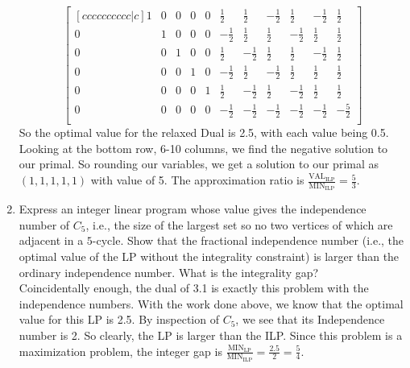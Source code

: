 \documentclass[12pt]{article}
\newenvironment{exercise}[2][Exercise]{\begin{trivlist}
		\item[\hskip \labelsep {\bfseries #1}\hskip \labelsep {\bfseries #2.}]}{\end{trivlist}}
\begin{document}
\begin{exercise}{3}
\begin{enumerate}
			\[\begin{bmatrix}[cccccccccc|c]
				1 &  0 &  0 & 0 & 0  & \frac{1}{2}  & \frac{1}{2}  & -\frac{1}{2}  & \frac{1}{2}  & -\frac{1}{2} & \frac{1}{2} \\
				0 &  1 &  0 & 0 & 0 & -\frac{1}{2} & \frac{1}{2}  & \frac{1}{2}  & -\frac{1}{2}  & \frac{1}{2} & \frac{1}{2} \\
				0 &  0 &  1 & 0 & 0  & \frac{1}{2}  & -\frac{1}{2} & \frac{1}{2}  & \frac{1}{2}  & -\frac{1}{2} & \frac{1}{2} \\
				0 &  0 &  0 & 1 & 0  & -\frac{1}{2} & \frac{1}{2}  & -\frac{1}{2} & \frac{1}{2}  & \frac{1}{2} & \frac{1}{2} \\
				0 &  0 &  0 & 0 & 1  & \frac{1}{2}  & -\frac{1}{2} & \frac{1}{2}  & -\frac{1}{2} & \frac{1}{2} & \frac{1}{2} \\
				0 &  0 &  0 & 0 & 0  & -\frac{1}{2}  & -\frac{1}{2} & -\frac{1}{2}  & -\frac{1}{2} & -\frac{1}{2} & -\frac{5}{2}\\
			\end{bmatrix}\]
			So the optimal value for the relaxed Dual is 2.5, with each value being 0.5. Looking at the bottom row, 6-10 columns, we find the negative solution to our primal. So rounding our variables, we get a solution to our primal as $(1,1,1,1,1)$ with value of 5. The approximation ratio is $\frac{\text{VAL}_{\text{ILP}}}{\text{MIN}_{\text{ILP}}} = \frac{5}{3}$.\\
			
			
			\item Express an integer linear program whose value gives the independence number of $C_5$, i.e., the size of the largest set so no two vertices of which are adjacent in a $5$-cycle.  Show that the fractional independence number (i.e., the optimal value of the LP without the integrality constraint) is larger than the ordinary independence number.  What is the integrality gap?\\
			
			Coincidentally enough, the dual of 3.1 is exactly this problem with the independence numbers. With the work done above, we know that the optimal value for this LP is 2.5. By inspection of $C_5$, we see that its Independence number is 2. So clearly, the LP is larger than the ILP. Since this problem is a maximization problem, the integer gap is $\frac{\text{MIN}_{\text{LP}}}{\text{MIN}_{\text{ILP}}} = \frac{2.5}{2} = \frac{5}{4}$.\\
		\end{enumerate}
	\end{exercise}
	
\end{document}
